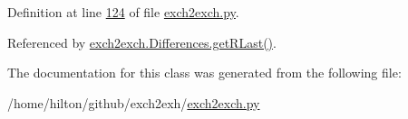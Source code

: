 Definition at line \hyperlink{exch2exch_8py_source_l00124}{124} of file \hyperlink{exch2exch_8py_source}{exch2exch.\+py}.



Referenced by \hyperlink{exch2exch_8py_source_l00147}{exch2exch.\+Differences.\+get\+R\+Last()}.



The documentation for this class was generated from the following file\+:\begin{DoxyCompactItemize}
\item 
/home/hilton/github/exch2exh/\hyperlink{exch2exch_8py}{exch2exch.\+py}\end{DoxyCompactItemize}
